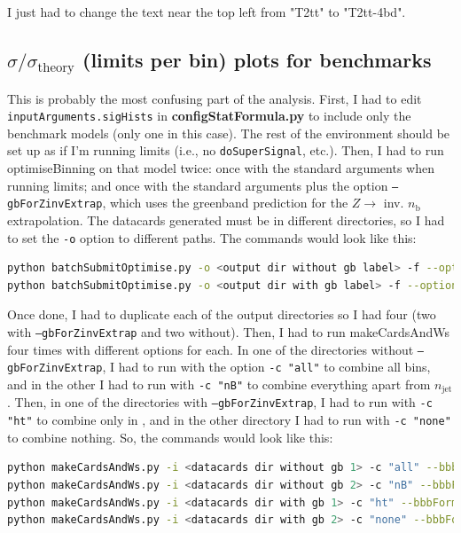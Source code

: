 I just had to change the text near the top left from "T2tt" to "T2tt-4bd".


\subsection{\texorpdfstring{$\sigma / \sigma_{\mathrm{theory}}$}{Sigma/sigma\_theory} (limits per bin) plots for benchmarks}

This is probably the most confusing part of the analysis. First, I had to edit \texttt{inputArguments.sigHists} in \textbf{configStatFormula.py} to include only the benchmark models (only one in this case). The rest of the environment should be set up as if I'm running limits (i.e., no \texttt{doSuperSignal}, etc.). Then, I had to run optimiseBinning on that model twice: once with the standard arguments when running limits; and once with the standard arguments plus the option \texttt{--gbForZinvExtrap}, which uses the greenband prediction for the $Z \rightarrow$ inv. $n_{\mathrm{b}}$ extrapolation. The datacards generated must be in different directories, so I had to set the \texttt{-o} option to different paths. The commands would look like this:

\begin{lstlisting}[belowskip=-0.7cm, language=sh, numbers=none]
python batchSubmitOptimise.py -o <output dir without gb label> -f --options "--shapeSystFromFile --getDataLumi --runFormula --extrapolateZinv --greenBand" --submit
python batchSubmitOptimise.py -o <output dir with gb label> -f --options "--shapeSystFromFile --getDataLumi --runFormula --extrapolateZinv --greenBand --gbForZinvExtrap" --submit
\end{lstlisting}

Once done, I had to duplicate each of the output directories so I had four (two with \texttt{--gbForZinvExtrap} and two without). Then, I had to run makeCardsAndWs four times with different options for each. In one of the directories without \texttt{--gbForZinvExtrap}, I had to run with the option \texttt{-c "all"} to combine all bins, and in the other I had to run with \texttt{-c "nB"} to combine everything apart from $n_{\mathrm{jet}}$. Then, in one of the directories with \texttt{--gbForZinvExtrap}, I had to run with \texttt{-c "ht"} to combine only in \HT, and in the other directory I had to run with \texttt{-c "none"} to combine nothing. So, the commands would look like this:

\begin{lstlisting}[belowskip=-0.7cm, language=sh, numbers=none]
python makeCardsAndWs.py -i <datacards dir without gb 1> -c "all" --bbbFormulaUssr --bbbOptSig
python makeCardsAndWs.py -i <datacards dir without gb 2> -c "nB" --bbbFormulaUssr --bbbOptSig
python makeCardsAndWs.py -i <datacards dir with gb 1> -c "ht" --bbbFormulaUssr --bbbOptSig
python makeCardsAndWs.py -i <datacards dir with gb 2> -c "none" --bbbFormulaUssr --bbbOptSig
\end{lstlisting}


